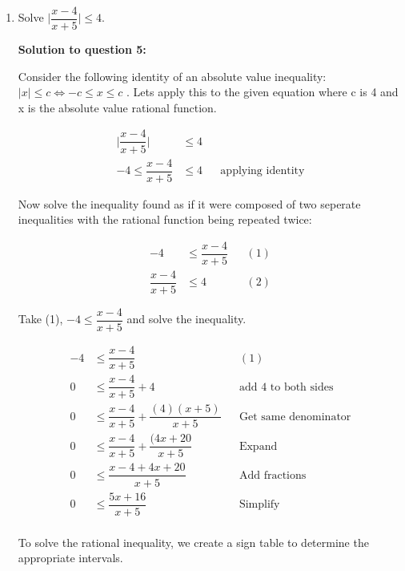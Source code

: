 \documentclass[12pt]{book}
\begin{document}
\begin{enumerate}
\item Solve $\bigg|\dfrac{x-4}{x+5}\bigg| \le 4$.

\vspace{0.3cm} 
\textbf{Solution to question 5:}

\vspace{0.5cm}
 Consider the following identity of an absolute value inequality: $|x| \leq c \Longleftrightarrow -c \leq x \leq c$
 . Lets apply this to the given equation where c is 4 and x is the absolute value rational function.
 \vspace{-0.3cm}

 \begin{align*}
    \bigg|\dfrac{x-4}{x+5}\bigg| &\le 4 \\
    -4 \le \dfrac{x-4}{x+5} & \le 4 && \text{applying identity}
 \end{align*}

Now solve the inequality found as if it were composed of two seperate inequalities with the rational function being repeated twice:

\begin{align*}
    -4 &\le \dfrac{x-4}{x+5} && (1)\\
    \dfrac{x-4}{x+5} &\le 4 && (2)
\end{align*}

\vspace{1cm}

Take (1), $-4 \le \dfrac{x-4}{x+5}$ and solve the inequality.

\begin{align*}
    -4 &\le \dfrac{x-4}{x+5} && (1)\\
    0 &\le \dfrac{x-4}{x+5} + 4 && \text{add 4 to both sides} \\
    0 &\le \dfrac{x-4}{x+5} + \dfrac{(4)(x+5)}{x+5} && \text{Get same denominator} \\
    0 &\le \dfrac{x-4}{x+5} + \dfrac{(4x+20}{x+5} && \text{Expand} \\
    0 &\le \dfrac{x-4+4x+20}{x+5} && \text{Add fractions} \\
    0 &\le \dfrac{5x+16}{x+5} && \text{Simplify} \\
\end{align*}

\newpage

\begin{center}
To solve the rational inequality, we create a sign table
 to determine the appropriate intervals.
\end{center}
\vspace{0.5cm}


\end{enumerate}
\end{document}

